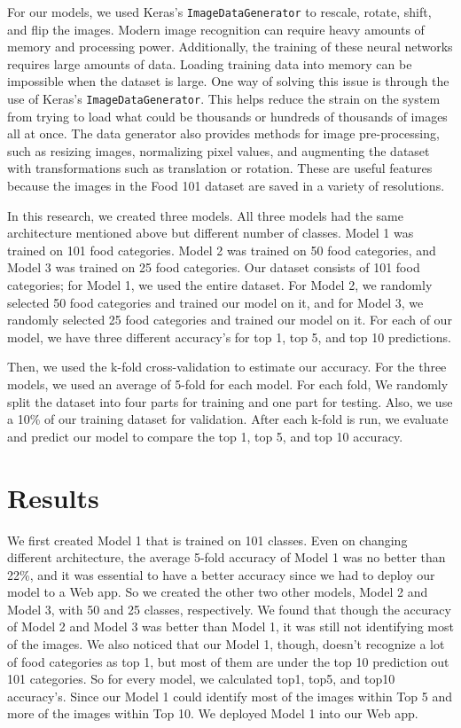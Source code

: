 \documentclass[conference]{IEEEtran}
\begin{document}
For our models, we used Keras's \texttt{ImageDataGenerator} to rescale, rotate, shift, and flip the images. Modern image recognition can require heavy amounts of memory and processing power. Additionally, the training of these neural networks requires large amounts of data. Loading training data into memory can be impossible when the dataset is large. One way of solving this issue is through the use of Keras's \texttt{ImageDataGenerator}. This helps reduce the strain on the system from trying to load what could be thousands or hundreds of thousands of images all at once. The data generator also provides methods for image pre-processing, such as resizing images, normalizing pixel values, and augmenting the dataset with transformations such as translation or rotation. These are useful features because the images in the Food 101 dataset are saved in a variety of resolutions.

In this research, we created three models. All three models had the same architecture mentioned above but different number of classes. Model 1 was trained on 101 food categories. Model 2 was trained on 50 food categories, and Model 3 was trained on 25 food categories. Our dataset consists of 101 food categories; for Model 1, we used the entire dataset. For Model 2, we randomly selected 50 food categories and trained our model on it, and for Model 3, we randomly selected 25 food categories and trained our model on it. For each of our model, we have three different accuracy's for top 1, top 5, and top 10 predictions.

Then, we used the k-fold cross-validation to estimate our accuracy. For the three models, we used an average of 5-fold for each model. For each fold, We randomly split the dataset into four parts for training and one part for testing. Also, we use a 10\% of our training dataset for validation. After each k-fold is run, we evaluate and predict our model to compare the top 1, top 5, and top 10 accuracy.

\section{Results}
We first created  Model 1 that is trained on 101 classes. Even on changing different architecture, the average 5-fold accuracy of Model 1 was no better than 22\%, and it was essential to have a better accuracy since we had to deploy our model to a Web app. So we created the other two other models, Model 2 and Model 3, with 50 and 25 classes, respectively. We found that though the accuracy of Model 2 and Model 3 was better than Model 1, it was still not identifying most of the images. We also noticed that our Model 1, though, doesn't recognize a lot of food categories as top 1, but most of them are under the top 10 prediction out 101 categories. So for every model, we calculated top1, top5, and top10 accuracy's. Since our Model 1 could identify most of the images within Top 5 and more of the images within Top 10. We deployed Model 1 into our Web app.
\end{document}
